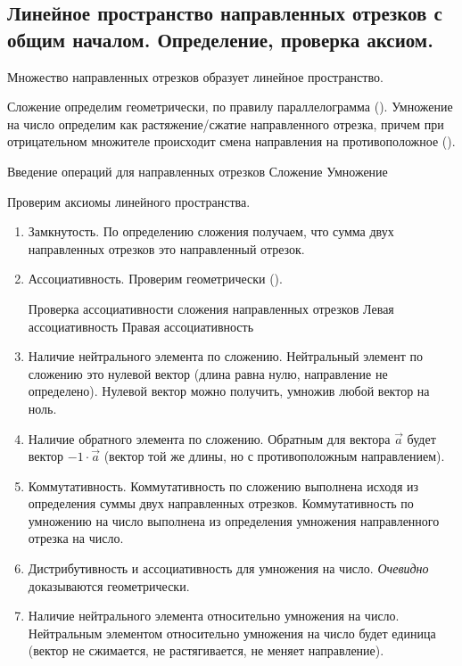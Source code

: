 \subsection{%
  Линейное пространство направленных отрезков с общим началом. Определение,
  проверка аксиом.%
}

\begin{remark}
  Множество направленных отрезков образует линейное пространство.
\end{remark}

Сложение определим геометрически, по правилу параллелограмма
(). Умножение на число определим как растяжение/сжатие
направленного отрезка, причем при отрицательном множителе происходит смена
направления на противоположное ().

  {Введение операций для направленных отрезков}
  {Сложение}
  {Умножение}

\begin{remark}
  Проверим аксиомы линейного пространства.

  \begin{enumerate}
  \item
    Замкнутость. По определению сложения получаем, что сумма двух направленных
    отрезков это направленный отрезок.
  
  \item
    Ассоциативность. Проверим геометрически ().

      {Проверка ассоциативности сложения направленных отрезков}
      {Левая ассоциативность}
      {Правая ассоциативность}
  
  \item
    Наличие нейтрального элемента по сложению. Нейтральный элемент по сложению
    это нулевой вектор (длина равна нулю, направление не определено). Нулевой
    вектор можно получить, умножив любой вектор на ноль.
    
  \item
    Наличие обратного элемента по сложению. Обратным для вектора \(\vec{a}\)
    будет вектор \(-1 \cdot \vec{a}\) (вектор той же длины, но с противоположным
    направлением).
  
  \item
    Коммутативность. Коммутативность по сложению выполнена исходя из определения
    суммы двух направленных отрезков. Коммутативность по умножению на число
    выполнена из определения умножения направленного отрезка на число.

  \item
    Дистрибутивность и ассоциативность для умножения на число. \textit{Очевидно}
    доказываются геометрически.
    
  \item
    Наличие нейтрального элемента относительно умножения на число. Нейтральным
    элементом относительно умножения на число будет единица (вектор не
    сжимается, не растягивается, не меняет направление).
  \end{enumerate}
\end{remark}